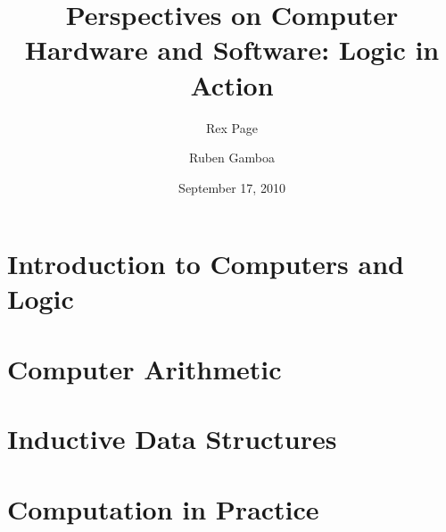 \documentclass[letterpaper,12pt,twoside,onecolumn,openright,draft,fleqn]{memoir}
\title{Perspectives on Computer Hardware and Software: Logic in Action}
\author{Rex Page \and Ruben Gamboa}
\date{September 17, 2010}
\begin{document}
\frontmatter

\maketitle

\clearpage
\tableofcontents
\clearpage

\mainmatter

\part{Introduction to Computers and Logic}









\part{Computer Arithmetic}







\part{Inductive Data Structures}











\part{Computation in Practice}








\backmatter
\end{document}
